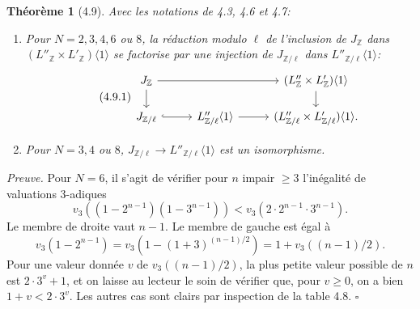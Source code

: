 \documentclass[10pt,a4paper]{article}
\newcommand{\Z}{\mathbb Z}
\theoremstyle{deligne}
\newtheorem*{theorem*}{Théorème}
\newenvironment{proofdel}{\textit{Preuve.}}{\hfill$\square$}
\begin{document}
\begin{theorem*}[4.9]
Avec les notations de 4.3, 4.6 et 4.7:
\begin{enumerate}[label=(\roman*)]
\item Pour \(N=2,3,4,6\) ou \(8\), la réduction modulo \(\ell\) de l'inclusion de \(J_{\Z}\) dans \((L''_{\Z}\times L'_{\Z})\langle1\rangle\) se factorise par une injection de \(J_{\Z/\ell}\) dans \(L''_{\Z/\ell}\langle1\rangle\):
\[
\tag{4.9.1}
\begin{tikzcd}[column sep=2.7em,row sep=1.45em]
J_{\Z} \arrow[rr] \arrow[d] && (L''_{\Z}\times L'_{\Z})\langle1\rangle \arrow[d]\\
J_{\Z/\ell} \arrow[r,hook] & L''_{\Z/\ell}\langle1\rangle \arrow[r] & (L''_{\Z/\ell}\times L'_{\Z/\ell})\langle1\rangle .
\end{tikzcd}
\]
\item Pour \(N=3,4\) ou \(8\), \(J_{\Z/\ell}\to L''_{\Z/\ell}\langle1\rangle\) est un isomorphisme.
\end{enumerate}
\end{theorem*}

\begin{proofdel}
Pour \(N=6\), il s'agit de vérifier pour \(n\) impair \(\ge3\) l'inégalité de valuations \(3\)-adiques
\[
v_3((1-2^{n-1})(1-3^{n-1}))<v_3(2\cdot2^{n-1}\cdot3^{n-1}).
\]
Le membre de droite vaut \(n-1\). Le membre de gauche est égal à
\[
v_3(1-2^{n-1})=v_3(1-(1+3)^{(n-1)/2})=1+v_3((n-1)/2).
\]
Pour une valeur donnée \(v\) de \(v_3((n-1)/2)\), la plus petite valeur possible de \(n\) est \(2\cdot3^v+1\), et on laisse au lecteur le soin de vérifier que, pour \(v\ge0\), on a bien \(1+v<2\cdot3^v\). Les autres cas sont clairs par inspection de la table 4.8.
\end{proofdel}
\end{document}

